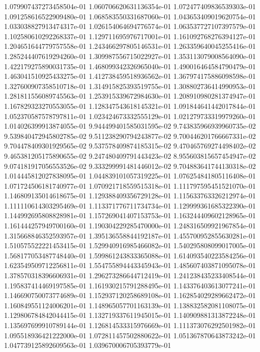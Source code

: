 1.079907437273458504e-01
1.060706620631136354e-01
1.072477409836539303e-01
1.091258616522909480e-01
1.068583550331687060e-01
1.043653409019620754e-01
1.033038827913474317e-01
1.026154064694776574e-01
1.063537727107397579e-01
1.102580610292268337e-01
1.129711695976717001e-01
1.161092768276394127e-01
1.204651644779757558e-01
1.243466297805146531e-01
1.263359640045255416e-01
1.285244407619294260e-01
1.309987556715022927e-01
1.353113079008564090e-01
1.422179275890031735e-01
1.468099342326965040e-01
1.490016464584790479e-01
1.463041510925433275e-01
1.412738459518936562e-01
1.367974175886098598e-01
1.327600907358510718e-01
1.314915825393519755e-01
1.308802736414990953e-01
1.281811556089745563e-01
1.253915339672984630e-01
1.208910980281374947e-01
1.167829323270553055e-01
1.128347543618145321e-01
1.091844641442017844e-01
1.052370587578797811e-01
1.023424673332555129e-01
1.021279733319979260e-01
1.014026399913874055e-01
9.944499401585031595e-02
9.743835966939960735e-02
9.539840472945802785e-02
9.511238290794243877e-02
9.700446201766667331e-02
9.704478409301929565e-02
9.537578409874185315e-02
9.470465769274498402e-02
9.465381205175890655e-02
9.247480409791443423e-02
8.955603815657454947e-02
9.074181917056553526e-02
9.333299991481446012e-02
9.704883641744130318e-02
1.014445812027838095e-01
1.044839101057319225e-01
1.076254841805116408e-01
1.071724506181740977e-01
1.070921718559515318e-01
1.111797595451521070e-01
1.146809135014618675e-01
1.129388409356729128e-01
1.115633763326212974e-01
1.111110614303295469e-01
1.113371776711734734e-01
1.129999361685322390e-01
1.144992695808828981e-01
1.157269041407153753e-01
1.163244409602128965e-01
1.161444257949700160e-01
1.190304229285470000e-01
1.248316509921967854e-01
1.315668846352593957e-01
1.395136558844192187e-01
1.455700952855630281e-01
1.510575522221453415e-01
1.529940916985466082e-01
1.540295808099017005e-01
1.568177053487748440e-01
1.599861243833365088e-01
1.614093540223584256e-01
1.623549509712256811e-01
1.554755894443345943e-01
1.485607403871095078e-01
1.378570318396606931e-01
1.296273286644712419e-01
1.241238435233408544e-01
1.195837414469197585e-01
1.161930215791288495e-01
1.143376403613077241e-01
1.146690750073774689e-01
1.152937120258689108e-01
1.162854029289662472e-01
1.160849551124006201e-01
1.148965057701163139e-01
1.138832582081108075e-01
1.129806784842044415e-01
1.132719337611945015e-01
1.140909881313872248e-01
1.135697699910789144e-01
1.126814533315976669e-01
1.111373076292501982e-01
1.095518936421222000e-01
1.072811457502880622e-01
1.051367870643873242e-01
1.047739125892609563e-01
1.039670006705393779e-01
